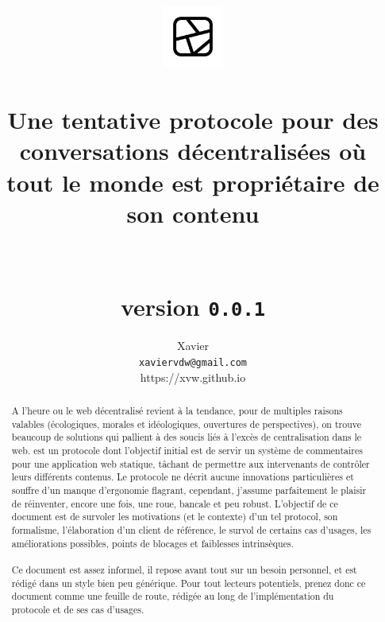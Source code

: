 \documentclass[a4paper,10pt]{article}
\title{
  \includegraphics[width=2cm]{../iconography/phragment-black.png}\\
  \bsc{Phragment}\\
  \large{
    Une tentative protocole pour des conversations décentralisées
    où tout le monde est propriétaire de son contenu\\~\\~\\
    \textbf{version} \texttt{0.0.1}
  }
}
\date{}
\author{
  Xavier \bsc{Van de Woestyne}\\
  \texttt{xaviervdw@gmail.com}\\
  \small{https://xvw.github.io}
}
\begin{document}
\maketitle

\begin{abstract}
  A l'heure ou le web décentralisé revient à la tendance, pour de multiples
  raisons valables (écologiques, morales et idéologiques, ouvertures de
  perspectives), on trouve beaucoup de solutions qui pallient à des soucis
  liés à l'excès de centralisation dans le web.  est un
  protocole dont l'objectif initial est de servir un système de commentaires
  pour une application web statique, tâchant de permettre aux intervenants
  de contrôler leurs différents contenus. Le protocole ne décrit aucune
  innovations particulières et souffre d'un manque d'ergonomie flagrant,
  cependant, j'assume parfaitement le plaisir de réinventer, encore une fois,
  une roue, bancale et peu robust. L'objectif de ce document est de survoler
  les motivations (et le contexte) d'un tel protocol, son formalisme,
  l'élaboration d'un client de référence, le survol de certains cas d'usages,
  les améliorations possibles, points de blocages et faiblesses intrinsèques.
  \\~\\
  Ce document est assez informel, il repose avant tout sur un besoin
  personnel, et est rédigé dans un style bien peu générique. Pour tout lecteurs
  potentiels, prenez donc ce document comme une feuille de route, rédigée
  au long de l'implémentation du protocole et de ses cas d'usages.
  \\
\end{abstract}

\end{document}
